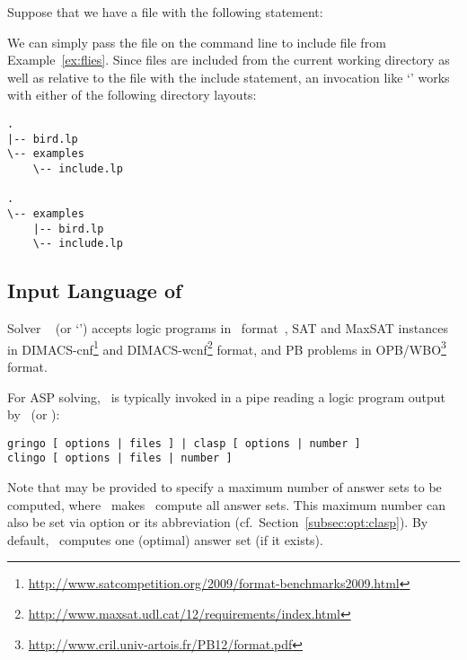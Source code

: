 \begin{example}
Suppose that we have a file
 with the following statement:%
%

%
We can simply pass the file on the command line
to include file  from Example~\ref{ex:flies}.
%
Since files are included from the current working directory
as well as relative to the file with the include statement,
an invocation like `'
works with either of the following directory layouts:
\begin{lstlisting}[numbers=none]
.
|-- bird.lp
\-- examples
    \-- include.lp

.
\-- examples
    |-- bird.lp
    \-- include.lp
\end{lstlisting}
%
\end{example}

\subsection{Input Language of \clasp}\label{subsec:lang:clasp}

Solver \clasp~\cite{gekanesc07b} (or `\clingo{}') accepts logic programs in \smodels\ format~\cite{lparseManual},
SAT and MaxSAT instances in DIMACS-cnf\footnote{\url{http://www.satcompetition.org/2009/format-benchmarks2009.html}}
and DIMACS-wcnf\footnote{\url{http://www.maxsat.udl.cat/12/requirements/index.html}} format,
and PB problems in OPB/WBO\footnote{\url{http://www.cril.univ-artois.fr/PB12/format.pdf}} format.

For ASP solving,
\clasp\ is typically invoked in a pipe reading
a logic program output by \gringo\ (or \clingo):
%
\begin{lstlisting}[numbers=none]
gringo [ options | files ] | clasp [ options | number ]
clingo [ options | files | number ]
\end{lstlisting}
%
Note that  may be provided to specify a maximum number of answer sets
to be computed, where~ makes \clasp\ compute all answer sets.
This maximum number can also be set via
option  or its abbreviation 
(cf.\ Section~\ref{subsec:opt:clasp}).
By default, \clasp\ computes one (optimal) answer set (if it exists).

